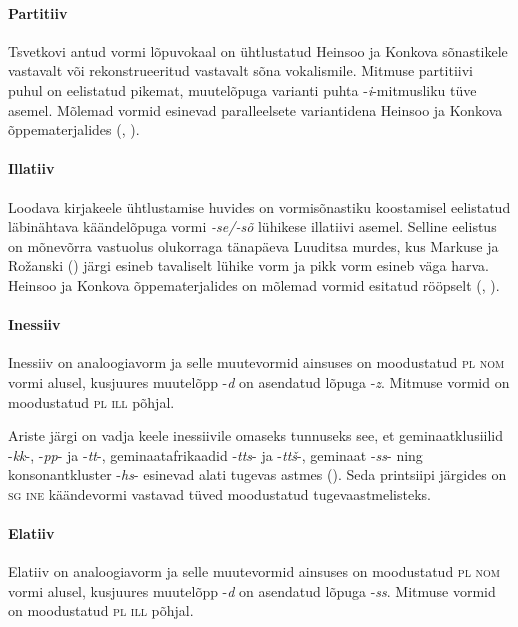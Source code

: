 \documentclass[12pt,a4paper]{article}
\newcommand{\msd}[1]{\textsc{#1}}
\begin{document}
\paragraph*{Partitiiv}
Tsvetkovi antud vormi lõpuvokaal on ühtlustatud Heinsoo ja Konkova sõnastikele vastavalt või rekonstrueeritud vastavalt sõna vokalismile. Mitmuse partitiivi puhul on eelistatud pikemat, muute\-lõpuga varianti puhta -\textit{i}-mitmusliku tüve asemel. Mõlemad vormid esinevad paralleelsete variantidena Heinsoo ja Konkova õppematerjalides (\cite[88]{heinsoo_vadsonakopittoja_2015}, \cite[10]{konkova_vaddceeli_2014}).


\paragraph*{Illatiiv}
Loodava kirjakeele ühtlustamise huvides on vormisõnastiku koostamisel eelistatud läbinähtava käändelõpuga vormi \textit{-se/-sõ} lühikese illatiivi asemel. Selline eelistus on mõnevõrra vastu\-olus olukorraga tänapäeva Luuditsa murdes, kus Markuse ja Rožanski (\citeyear[247]{markus_comitative_2014}) järgi esineb tavaliselt lühike vorm ja pikk vorm esineb väga harva. Heinsoo ja Konkova õppe\-materjalides on mõlemad vormid esitatud rööpselt (\cite[88]{heinsoo_vadsonakopittoja_2015}, \cite[10]{konkova_vaddceeli_2014}).


\paragraph*{Inessiiv}
Inessiiv on analoogiavorm ja selle muutevormid ainsuses on moodustatud \msd{pl nom} vormi alusel, kusjuures muutelõpp -\textit{d} on asendatud lõpuga -\textit{z}. Mitmuse vormid on moodustatud \msd{pl ill} põhjal.

Ariste järgi on vadja keele inessiivile omaseks tunnuseks see, et geminaat\-klusiilid -\textit{kk}-, -\textit{pp}- ja -\textit{tt}-, geminaat\-afrikaadid -\textit{tts}- ja -\textit{ttš}-, geminaat -\textit{ss}- ning konsonant\-kluster -\textit{hs}- esinevad alati tugevas astmes (\cite[23]{ariste_grammar_1968}). Seda printsiipi järgides on \msd{sg ine} käände\-vormi vastavad tüved moodustatud tugeva\-astmelisteks.


\paragraph*{Elatiiv}
Elatiiv on analoogiavorm ja selle muutevormid ainsuses on moodustatud \msd{pl nom} vormi alusel, kusjuures muutelõpp -\textit{d} on asendatud lõpuga -\textit{ss}. Mitmuse vormid on moodustatud \msd{pl ill} põhjal.
\end{document}
